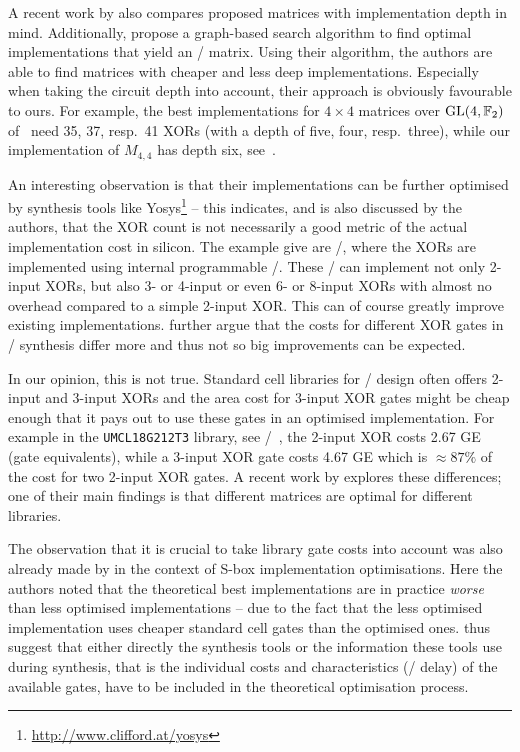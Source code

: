 A recent work by \textcite{ToSC:DuvLeu18} also compares proposed matrices with implementation depth in mind.
Additionally, \citeauthor{ToSC:DuvLeu18} propose a graph-based search algorithm to find optimal implementations that yield an \MDS/ matrix.
Using their algorithm, the authors are able to find matrices with cheaper and less deep implementations.
Especially when taking the circuit depth into account, their approach is obviously favourable to ours.
For example, the best implementations for $4 \times 4$ matrices over $\mathrm{GL}(4, \mathbb{F}_2)$ of~\cite{ToSC:DuvLeu18} need 35, 37, resp.\ 41 XORs (with a depth of five, four, resp.\ three), while our implementation of $M_{4,4}$ has depth six, see~\cite[Table~1]{ToSC:DuvLeu18}.

An interesting observation is that their implementations can be further optimised by synthesis tools like Yosys\footnote{%
    \url{http://www.clifford.at/yosys}
} -- this indicates, and is also discussed by the authors, that the XOR count is not necessarily a good metric of the actual implementation cost in silicon.
The example \citeauthor{ToSC:DuvLeu18} give are \FPGAp/, where the XORs are implemented using internal programmable \LUTp/.
These \LUTp/ can implement not only 2-input XORs, but also 3- or 4-input or even 6- or 8-input XORs with almost no overhead compared to a simple 2-input XOR.
This can of course greatly improve existing implementations.
\citeauthor{ToSC:DuvLeu18} further argue that the costs for different XOR gates in \ASIC/ synthesis differ more and thus not so big improvements can be expected.

In our opinion, this is not true.
Standard cell libraries for \ASIC/ design often offers 2-input and 3-input XORs and the area cost for 3-input XOR gates might be cheap enough that it pays out to use these gates in an optimised implementation.
For example in the \texttt{UMCL18G212T3} library, see \eg/~\cite[Table~2.1]{PhD:Poschmann09}, the 2-input XOR costs 2.67 GE (gate equivalents), while a 3-input XOR gate costs 4.67 GE which is $\approx 87\%$ of the cost for two 2-input XOR gates.
A recent work by \textcite{IWSEC:BanFunIso19} explores these differences; one of their main findings is that different matrices are optimal for different libraries.

The observation that it is crucial to take library gate costs into account was also already made by \textcite{TCHES:ReyTahAsh18} in the context of S-box implementation optimisations.
Here the authors noted that the theoretical best implementations are in practice \emph{worse} than less optimised implementations -- due to the fact that the less optimised implementation uses cheaper standard cell gates than the optimised ones.
\citeauthor{TCHES:ReyTahAsh18} thus suggest that either directly the synthesis tools or the information these tools use during synthesis, that is the individual costs and characteristics (\eg/ delay) of the available gates, have to be included in the theoretical optimisation process.

